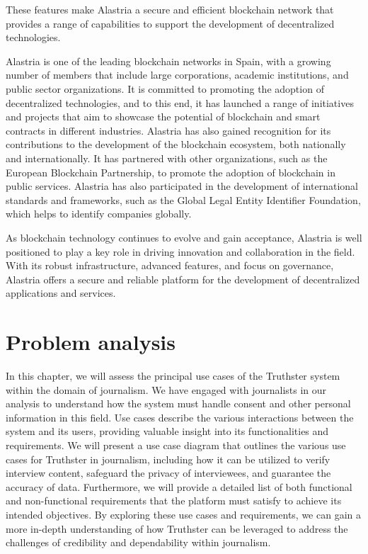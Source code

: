 \documentclass[target=mst,aauheader=]{thud}
\begin{document}
    These features make Alastria a secure and efficient blockchain network that provides a range of capabilities to support the development of decentralized technologies.\par

    Alastria is one of the leading blockchain networks in Spain, with a growing number of members that include large corporations, academic institutions, and public sector organizations. It is committed to promoting the adoption of decentralized technologies, and to this end, it has launched a range of initiatives and projects that aim to showcase the potential of blockchain and smart contracts in different industries.
    Alastria has also gained recognition for its contributions to the development of the blockchain ecosystem, both nationally and internationally. It has partnered with other organizations, such as the European Blockchain Partnership, to promote the adoption of blockchain in public services. Alastria has also participated in the development of international standards and frameworks, such as the Global Legal Entity Identifier Foundation, which helps to identify companies globally.\par
    As blockchain technology continues to evolve and gain acceptance, Alastria is well positioned to play a key role in driving innovation and collaboration in the field. With its robust infrastructure, advanced features, and focus on governance, Alastria offers a secure and reliable platform for the development of decentralized applications and services.

\chapter{Problem analysis}
\label{problemAnalysis}

In this chapter, we will assess the principal use cases of the Truthster system within the domain of journalism. We have engaged with journalists in our analysis to understand how the system must handle consent and other personal information in this field. Use cases describe the various interactions between the system and its users, providing valuable insight into its functionalities and requirements. We will present a use case diagram that outlines the various use cases for Truthster in journalism, including how it can be utilized to verify interview content, safeguard the privacy of interviewees, and guarantee the accuracy of data. Furthermore, we will provide a detailed list of both functional and non-functional requirements that the platform must satisfy to achieve its intended objectives. By exploring these use cases and requirements, we can gain a more in-depth understanding of how Truthster can be leveraged to address the challenges of credibility and dependability within journalism.
\end{document}
